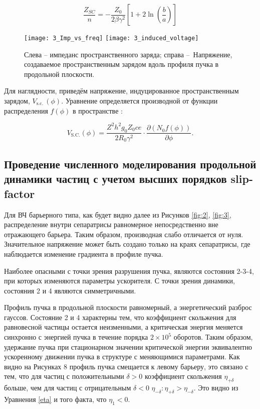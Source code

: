 \begin{equation}
\frac{Z_{SC}}{n}=-\frac{Z_0}{2\beta\gamma^2}\left[1+2\ln{\left(\frac{b}{a}\right)}\right]
\label{sc}
\end{equation}

\begin{figure}[!h]
   \texttt{[image: 3\_Imp\_vs\_freq]}
   \texttt{[image: 3\_induced\_voltage]}
   \caption{Слева – импеданс пространственного заряда; справа – Напряжение, создаваемое пространственным 
   зарядом вдоль профиля пучка в продольной плоскости. }
   \label{fig:signal}
\end{figure}

Для наглядности, приведём напряжение, индуцированное про\-стран\-стве\-нным зарядом, $V_{\mathrm{s.c.\ }}(\phi)$. Уравнение определяется производной от функции распределения $f(\phi)$ в пространстве \cite{sc}:

\begin{equation}
V_{\text{S.C.}}\left(\phi\right)=\frac{Z^2h^2g_0Z_0ce}{2R_0\gamma^2}\cdot\frac{\partial\left(N_0f\left(\phi\right)\right)}{\partial\phi}.
\label{V_sc}
\end{equation}

	\subsection{Проведение численного моделирования продольной динамики частиц с учетом высших порядков slip- factor}\label{subsec:transition_jump/regular/slip_factor}

\par Для ВЧ барьерного типа, как будет видно далее из Рисунков \ref{fig:2}, \ref{fig:3}, распределение внутри сепаратрисы равномерное непосредственно вне от\-ра\-жа\-ющего барьера. Таким образом, производная слабо отличается от нуля. Значительное напряжение может быть создано только на кра\-ях сепаратрисы, где наблюдается изменение градиента в профиле пучка.

\par Наиболее опасными с точки зрения разрушения пучка, являются со\-сто\-я\-ния 2-3-4, при которых изменяются параметры ускорителя. С точки зрения динамики, состояния 2 и 4 являются симметричными.
\par Профиль пучка в продольной плоскости равномерный, а э\-нер\-ге\-ти\-чес\-кий разброс гауссов. Состояние 2 и 4 характерны тем, что коэффициент скольжения для равновесной частицы остается неизменными, а кри\-ти\-чес\-кая энергия меняется синхронно с энергией пучка в течение порядка $2\times{10}^5$ оборотов. Таким образом, удержание пучка при стационарном значении критической энергии эквивалентно ускоренному движении пуч\-ка в структуре с меняющимися параметрами. Как видно на Рисунках 8 профиль пучка смещается к левому барьеру, это связано с тем, что для частиц с положительными $\delta>0$ коэффициент скольжения $\eta_{+\delta}$ больше, чем для частиц с отрицательным $\delta<0$ $\eta_{-\delta}: \eta_{+\delta}>\eta_{-\delta}$. Это видно из Уравнения \ref{eta} и того факта, что $\eta_1<0$. 

